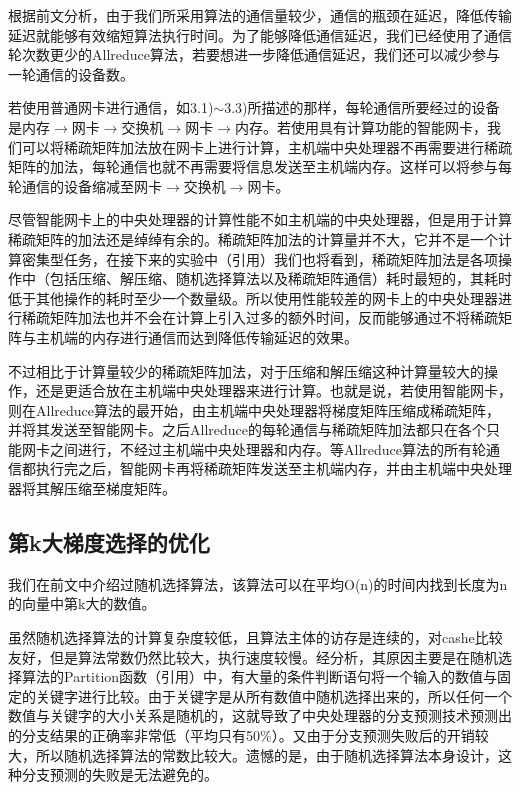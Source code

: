 根据前文分析，由于我们所采用算法的通信量较少，通信的瓶颈在延迟，降低传输延迟就能够有效缩短算法执行时间。为了能够降低通信延迟，我们已经使用了通信轮次数更少的Allreduce算法，若要想进一步降低通信延迟，我们还可以减少参与一轮通信的设备数。

若使用普通网卡进行通信，如3.1)$\sim$3.3)所描述的那样，每轮通信所要经过的设备是内存$\rightarrow$网卡$\rightarrow$交换机$\rightarrow$网卡$\rightarrow$内存。若使用具有计算功能的智能网卡，我们可以将稀疏矩阵加法放在网卡上进行计算，主机端中央处理器不再需要进行稀疏矩阵的加法，每轮通信也就不再需要将信息发送至主机端内存。这样可以将参与每轮通信的设备缩减至网卡$\rightarrow$交换机$\rightarrow$网卡。

尽管智能网卡上的中央处理器的计算性能不如主机端的中央处理器，但是用于计算稀疏矩阵的加法还是绰绰有余的。稀疏矩阵加法的计算量并不大，它并不是一个计算密集型任务，在接下来的实验中（引用）我们也将看到，稀疏矩阵加法是各项操作中（包括压缩、解压缩、随机选择算法以及稀疏矩阵通信）耗时最短的，其耗时低于其他操作的耗时至少一个数量级。所以使用性能较差的网卡上的中央处理器进行稀疏矩阵加法也并不会在计算上引入过多的额外时间，反而能够通过不将稀疏矩阵与主机端的内存进行通信而达到降低传输延迟的效果。

不过相比于计算量较少的稀疏矩阵加法，对于压缩和解压缩这种计算量较大的操作，还是更适合放在主机端中央处理器来进行计算。也就是说，若使用智能网卡，则在Allreduce算法的最开始，由主机端中央处理器将梯度矩阵压缩成稀疏矩阵，并将其发送至智能网卡。之后Allreduce的每轮通信与稀疏矩阵加法都只在各个只能网卡之间进行，不经过主机端中央处理器和内存。等Allreduce算法的所有轮通信都执行完之后，智能网卡再将稀疏矩阵发送至主机端内存，并由主机端中央处理器将其解压缩至梯度矩阵。

\subsection{第k大梯度选择的优化}
\label{subsec:topKOptimize}
我们在前文中介绍过随机选择算法，该算法可以在平均O(n)的时间内找到长度为n的向量中第k大的数值。

虽然随机选择算法的计算复杂度较低，且算法主体的访存是连续的，对cashe比较友好，但是算法常数仍然比较大，执行速度较慢。经分析，其原因主要是在随机选择算法的Partition函数（引用）中，有大量的条件判断语句将一个输入的数值与固定的关键字进行比较。由于关键字是从所有数值中随机选择出来的，所以任何一个数值与关键字的大小关系是随机的，这就导致了中央处理器的分支预测技术预测出的分支结果的正确率非常低（平均只有50\%）。又由于分支预测失败后的开销较大，所以随机选择算法的常数比较大。遗憾的是，由于随机选择算法本身设计，这种分支预测的失败是无法避免的。

